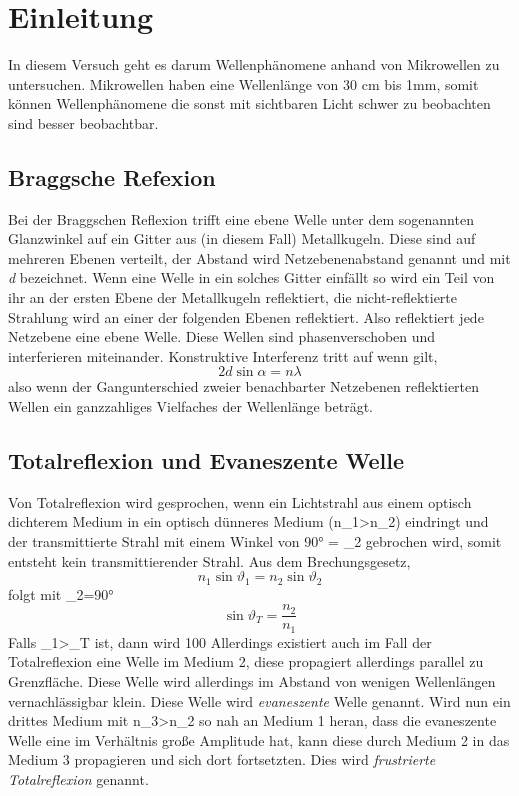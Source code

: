 \section{Einleitung}
In diesem Versuch geht es darum Wellenphänomene anhand von Mikrowellen zu untersuchen.
Mikrowellen haben eine Wellenlänge von 30 \si{cm} bis 1\si{mm}, somit können Wellenphänomene die sonst mit sichtbaren Licht schwer zu beobachten sind besser beobachtbar.
\subsection{Braggsche Refexion}
Bei der Braggschen Reflexion trifft eine ebene Welle unter dem sogenannten Glanzwinkel \alpha auf ein Gitter aus (in diesem Fall) Metallkugeln. Diese sind auf mehreren Ebenen verteilt, der Abstand wird Netzebenenabstand genannt und mit \textit{d} bezeichnet.
Wenn eine Welle in ein solches Gitter einfällt so wird ein Teil von ihr an der ersten Ebene der Metallkugeln reflektiert, die nicht-reflektierte Strahlung wird an einer der folgenden Ebenen reflektiert. Also reflektiert jede Netzebene eine ebene Welle. Diese Wellen sind phasenverschoben und interferieren miteinander. Konstruktive Interferenz tritt auf wenn gilt,
\begin{equation}
2\textit{d}\sin \alpha=n\lambda
\end{equation}
also wenn der Gangunterschied zweier benachbarter Netzebenen reflektierten Wellen ein ganzzahliges Vielfaches der Wellenlänge beträgt.
\subsection{Totalreflexion und Evaneszente Welle}
Von Totalreflexion wird gesprochen, wenn ein Lichtstrahl aus einem optisch dichterem Medium in ein optisch dünneres Medium (n_{1}>n_{2}) eindringt und der transmittierte Strahl mit einem Winkel von 90° = \vartheta_{2} gebrochen wird, somit entsteht kein transmittierender Strahl.
Aus dem Brechungsgesetz,
\begin{equation}
n_{1}\sin \vartheta_{1}=n_{2}\sin\vartheta_{2}
\end{equation}
folgt mit \vartheta_{2}=90°
\begin{equation}
\sin\vartheta_{T}=\frac{n_{2}}{n_{1}}
\end{equation}
Falls \vartheta_{1}>\vartheta_{T} ist, dann wird 100%
Allerdings existiert auch im Fall der Totalreflexion eine Welle im Medium 2, diese propagiert allerdings parallel zu Grenzfläche. Diese Welle wird allerdings im Abstand von wenigen Wellenlängen vernachlässigbar klein. Diese Welle wird \textit{evaneszente} Welle genannt.
Wird nun ein drittes Medium mit n_{3}>n_{2} so nah an Medium 1 heran, dass die evaneszente Welle eine im Verhältnis große Amplitude hat, kann diese durch Medium 2 in das Medium 3 propagieren und sich dort fortsetzten. Dies wird \textit{frustrierte Totalreflexion} genannt.



